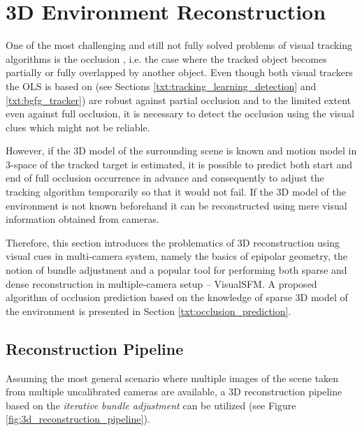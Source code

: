 \section{3D Environment Reconstruction} \label{txt:3d_environment_reconstruction}

One of the most challenging and still not fully solved problems of visual tracking algorithms is the occlusion \cite{Zhang:2010:RVT:1937728.1937766, conf/iccv/KwakNHH11}, i.e. the case where the tracked object becomes partially or fully overlapped by another object. Even though both visual trackers the OLS is based on (see Sections \ref{txt:tracking_learning_detection} and \ref{txt:bgfg_tracker}) are robust against partial occlusion and to the limited extent even against full occlusion, it is necessary to detect the occlusion using the visual clues which might not be reliable. 

However, if the 3D model of the surrounding scene is known and motion model in 3-space of the tracked target is estimated, it is possible to predict both start and end of full occlusion occurrence in advance and consequently to adjust the tracking algorithm temporarily so that it would not fail. If the 3D model of the environment is not known beforehand it can be reconstructed using mere visual information obtained from cameras.

Therefore, this section introduces the problematics of 3D reconstruction using visual cues in multi-camera system, namely the basics of epipolar geometry, the notion of bundle adjustment and a popular tool for performing both sparse and dense reconstruction in multiple-camera setup -- VisualSFM. A proposed algorithm of occlusion prediction based on the knowledge of sparse 3D model of the environment is presented in Section \ref{txt:occlusion_prediction}. 

\subsection{Reconstruction Pipeline} \label{txt:reconstruction_pipeline}

Assuming the most general scenario where multiple images of the scene taken from multiple uncalibrated cameras are available, a 3D reconstruction pipeline based on the \textit{iterative bundle adjustment} can be utilized \cite{Snavely:2006:PTE:1179352.1141964} (see Figure \ref{fig:3d_reconstruction_pipeline}).

